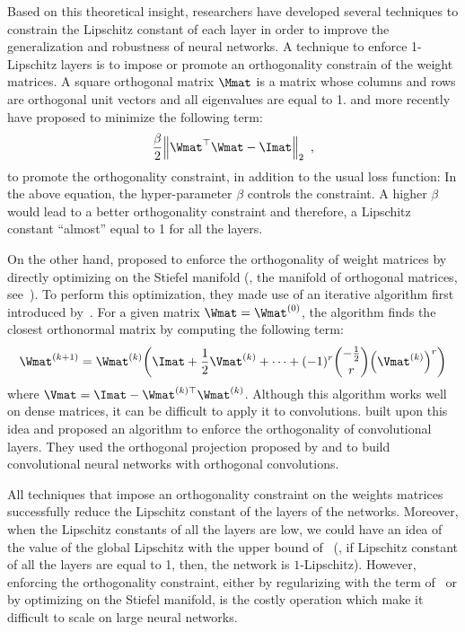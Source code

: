 Based on this theoretical insight, researchers have developed several techniques to constrain the Lipschitz constant of each layer in order to improve the generalization and robustness of neural networks.
A technique to enforce 1-Lipschitz layers is to impose or promote an orthogonality constrain of the weight matrices.
A square orthogonal matrix $\Mmat$ is a matrix whose columns and rows are orthogonal unit vectors and all eigenvalues are equal to 1.
\citet{cisse2017parseval} and more recently \citet{wang2020orthogonal,huang2020controllable} have proposed to minimize the following term:
\begin{equation} \label{equation:ch3-orthogonality_constraint}
  \frac{\beta}{2} \norm{\Wmat^\top \Wmat - \Imat}_2  \enspace, 
\end{equation}
to promote the orthogonality constraint, in addition to the usual loss function:
In the above equation, the hyper-parameter $\beta$ controls the constraint.
A higher $\beta$ would lead to a better orthogonality constraint and therefore, a Lipschitz constant ``almost'' equal to 1 for all the layers.

On the other hand, \citet{anil2019sorting} proposed to enforce the orthogonality of weight matrices by directly optimizing on the Stiefel
manifold (\ie, the manifold of orthogonal matrices, see~\citet{absil2009optimization}).
To perform this optimization, they made use of an iterative algorithm first introduced by~\citet{bjorck1971iterative}.
For a given matrix $\Wmat = \Wmat^{(0)}$, the algorithm finds the closest orthonormal matrix by computing the following term:
\begin{equation}
  \Wmat^{(k+1)} = \Wmat^{(k)} \left( \Imat + \frac{1}{2} \Vmat^{(k)} + \cdots + (-1)^r {-\frac{1}{2} \choose r}  \left(\Vmat^{(k)}\right)^r \right)
\end{equation}
where $\Vmat = \Imat - \Wmat^{(k)\top} \Wmat^{(k)}$.
Although this algorithm works well on dense matrices, it can be difficult to apply it to convolutions. 
\citet{li2019preventing} built upon this idea and proposed an algorithm to enforce the orthogonality of convolutional layers.
They used the orthogonal projection proposed by \citet{kautsky1994matrix} and \citet{xiao2018dynamical} to build convolutional neural networks with orthogonal convolutions.

All techniques that impose an orthogonality constraint on the weights matrices successfully reduce the Lipschitz constant of the layers of the networks.
Moreover, when the Lipschitz constants of all the layers are low, we could have an idea of the value of the global Lipschitz with the upper bound of~ (\ie, if Lipschitz constant of all the layers are equal to 1, then, the network is $1$-Lipschitz).
However, enforcing the orthogonality constraint, either by regularizing with the term of~ or by optimizing on the Stiefel manifold, is the costly operation which make it difficult to scale on large neural networks.




